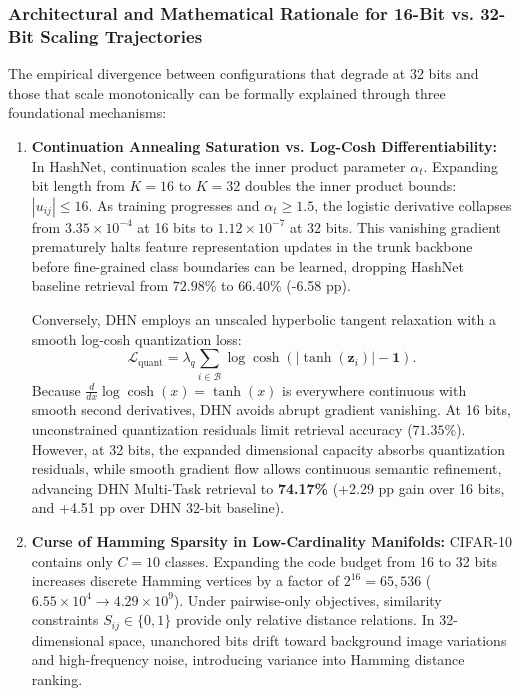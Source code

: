 \documentclass[10pt,conference]{IEEEtran}
\begin{document}
\subsubsection{Architectural and Mathematical Rationale for 16-Bit vs. 32-Bit Scaling Trajectories}
The empirical divergence between configurations that degrade at 32 bits and those that scale monotonically can be formally explained through three foundational mechanisms:
\begin{enumerate}
    \item \textbf{Continuation Annealing Saturation vs. Log-Cosh Differentiability:}
    In HashNet, continuation scales the inner product parameter $\alpha_t$. Expanding bit length from $K=16$ to $K=32$ doubles the inner product bounds: $|u_{ij}| \le 16$. As training progresses and $\alpha_t \ge 1.5$, the logistic derivative collapses from $3.35 \times 10^{-4}$ at 16 bits to $1.12 \times 10^{-7}$ at 32 bits. This vanishing gradient prematurely halts feature representation updates in the trunk backbone before fine-grained class boundaries can be learned, dropping HashNet baseline retrieval from $72.98\%$ to $66.40\%$ (-6.58 pp).
    
    Conversely, DHN employs an unscaled hyperbolic tangent relaxation with a smooth log-cosh quantization loss:
    \begin{equation}
        \mathcal{L}_{\text{quant}} = \lambda_q \sum_{i \in \mathcal{B}} \log \cosh(|\tanh(\mathbf{z}_i)| - \mathbf{1}).
    \end{equation}
    Because $\frac{d}{dx} \log \cosh(x) = \tanh(x)$ is everywhere continuous with smooth second derivatives, DHN avoids abrupt gradient vanishing. At 16 bits, unconstrained quantization residuals limit retrieval accuracy ($71.35\%$). However, at 32 bits, the expanded dimensional capacity absorbs quantization residuals, while smooth gradient flow allows continuous semantic refinement, advancing DHN Multi-Task retrieval to \textbf{74.17\%} (+2.29 pp gain over 16 bits, and +4.51 pp over DHN 32-bit baseline).

    \item \textbf{Curse of Hamming Sparsity in Low-Cardinality Manifolds:}
    CIFAR-10 contains only $C=10$ classes. Expanding the code budget from 16 to 32 bits increases discrete Hamming vertices by a factor of $2^{16} = 65{,}536$ ($6.55 \times 10^4 \to 4.29 \times 10^9$). Under pairwise-only objectives, similarity constraints $S_{ij} \in \{0, 1\}$ provide only relative distance relations. In 32-dimensional space, unanchored bits drift toward background image variations and high-frequency noise, introducing variance into Hamming distance ranking.


\end{enumerate}
\end{document}

